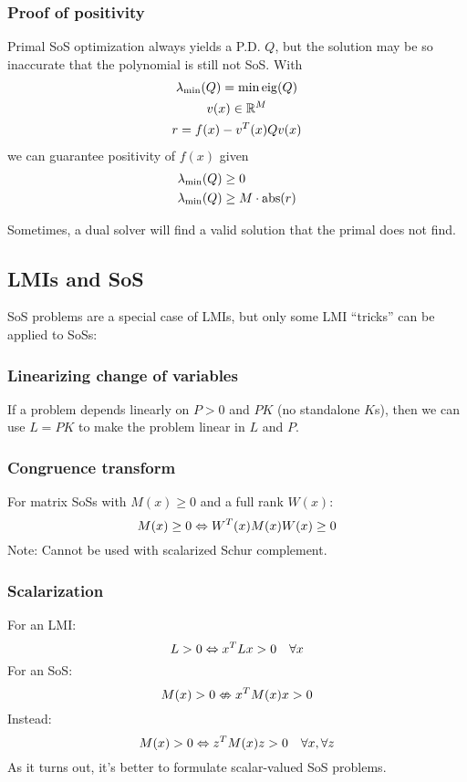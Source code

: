 \subsubsection{Proof of positivity}
Primal SoS optimization always yields a P.D. $Q$, but the solution may be so inaccurate that the polynomial is still not SoS. With
%
\begin{gather}
    \lambda_{\min}(Q) = \min \operatorname{eig}(Q) \\
    v(x) \in \mathbb{R}^M \\
    r = f(x) - v^{T}(x) Q v(x)
\end{gather}
%
we can guarantee positivity of $f(x)$ given
%
\begin{equation}
  \begin{split}
    \lambda_{\min}(Q) &\geq 0 \\
    \lambda_{\min}(Q) &\geq M \cdot \operatorname{abs}(r)
  \end{split}
\end{equation}

Sometimes, a dual solver will find a valid solution that the primal does not find.

\subsection{LMIs and SoS}
SoS problems are a special case of LMIs, but only some LMI ``tricks'' can be applied to SoSs:

\subsubsection{Linearizing change of variables}
If a problem depends linearly on $P>0$ and $PK$ (no standalone $K$s), then we can use $L = PK$ to make the problem linear in $L$ and $P$.

\subsubsection{Congruence transform}
For matrix SoSs with $M(x) \geq 0$ and a full rank $W(x)$:
\begin{equation}
  M(x) \geq 0 \Leftrightarrow W^{T}(x) M(x) W(x) \geq 0
\end{equation}
Note: Cannot be used with scalarized Schur complement.

\subsubsection{Scalarization}
For an LMI:
%
\begin{equation}
  L > 0 \Leftrightarrow x^{T} L x > 0 \quad \forall x
\end{equation}
%
For an SoS:
%
\begin{equation}
  M(x) > 0 \nLeftrightarrow x^{T} M(x) x > 0
\end{equation}
%
Instead:
%
\begin{equation}
  M(x) > 0 \Leftrightarrow z^{T} M(x) z > 0 \quad \forall x, \forall z
\end{equation}
%
As it turns out, it's better to formulate scalar-valued SoS problems.

